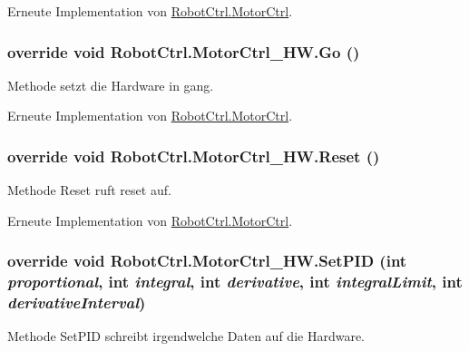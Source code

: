 Erneute Implementation von \hyperlink{class_robot_ctrl_1_1_motor_ctrl_aa4d43c3586f611f8ca12924b0a92189b}{RobotCtrl.MotorCtrl}.

\hypertarget{class_robot_ctrl_1_1_motor_ctrl___h_w_a451b6be6938c652e8a284545a1929089}{
\subsubsection[{Go}]{\setlength{\rightskip}{0pt plus 5cm}override void RobotCtrl.MotorCtrl\_\-HW.Go ()}}
\label{class_robot_ctrl_1_1_motor_ctrl___h_w_a451b6be6938c652e8a284545a1929089}
Methode setzt die Hardware in gang. 

Erneute Implementation von \hyperlink{class_robot_ctrl_1_1_motor_ctrl_a1c2505454168fc2d4287fe7052425d4e}{RobotCtrl.MotorCtrl}.

\hypertarget{class_robot_ctrl_1_1_motor_ctrl___h_w_a1a116e83d87c50119567ff4ae334b239}{
\subsubsection[{Reset}]{\setlength{\rightskip}{0pt plus 5cm}override void RobotCtrl.MotorCtrl\_\-HW.Reset ()}}
\label{class_robot_ctrl_1_1_motor_ctrl___h_w_a1a116e83d87c50119567ff4ae334b239}
Methode Reset ruft reset auf. 

Erneute Implementation von \hyperlink{class_robot_ctrl_1_1_motor_ctrl_a57b1bb7cb3895bc5d867848926b57f1e}{RobotCtrl.MotorCtrl}.

\hypertarget{class_robot_ctrl_1_1_motor_ctrl___h_w_a24f22cd266cce1e701f9823e02816ff5}{
\subsubsection[{SetPID}]{\setlength{\rightskip}{0pt plus 5cm}override void RobotCtrl.MotorCtrl\_\-HW.SetPID (int {\em proportional}, \/  int {\em integral}, \/  int {\em derivative}, \/  int {\em integralLimit}, \/  int {\em derivativeInterval})}}
\label{class_robot_ctrl_1_1_motor_ctrl___h_w_a24f22cd266cce1e701f9823e02816ff5}
Methode SetPID schreibt irgendwelche Daten auf die Hardware. 


